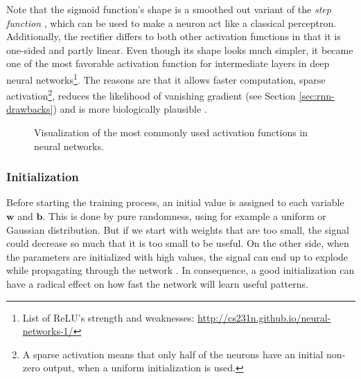 Note that the sigmoid function's shape is a smoothed out variant of the \textit{step function} \parencite{neural_nets_deep_learning}, which can be used to make a neuron act like a classical perceptron. Additionally, the rectifier differs to both other activation functions in that it is one-sided and partly linear. Even though its shape looks much simpler, it became one of the most favorable activation function for intermediate layers in deep neural networks\footnote{List of ReLU's strength and weaknesses: \url{http://cs231n.github.io/neural-networks-1/}}. The reasons are that it allows faster computation, sparse activation\footnote{{A sparse activation means that only half of the neurons have an initial non-zero output, when a uniform initialization is used.}}, reduces the likelihood of vanishing gradient (see Section \ref{sec:rnn-drawbacks}) and is more biologically plausible \parencite{relu}.

\begin{figure}[htpb]
  \centering
  \hspace*{-1.0cm}
  {
  }
  \caption[Activation Functions]{Visualization of the most commonly used activation functions in neural networks.}\label{fig:activations}
\end{figure}

\subsubsection{Initialization}

Before starting the training process, an initial value is assigned to each variable $ \textbf{w} $ and $ \textbf{b} $. This is done by pure randomness, using for example a uniform or Gaussian distribution. But if we start with weights that are too small, the signal could decrease so much that it is too small to be useful. On the other side, when the parameters are initialized with high values, the signal can end up to explode while propagating through the network \parencite{understand_xavier}. In consequence, a good initialization can have a radical effect on how fast the network will learn useful patterns.

